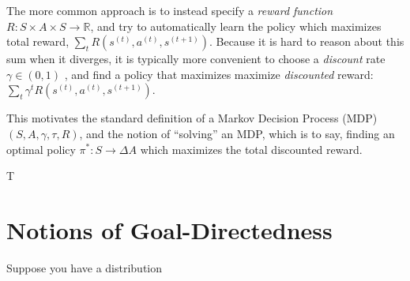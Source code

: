 \documentclass{article}
\DeclareMathOperator*{\argmax}{\arg\max}
\DeclareMathOperator*{\Ex}{\mathbb E}
\begin{document}
    The more common approach is to instead specify a \emph{reward function} $R : S \times A \times S \to \mathbb R$, and try to automatically learn the policy which maximizes total reward, $\sum_{t} R(s^{(t)}, a^{(t)}, s^{(t+1)})$. 
    Because it is hard to reason about this sum when it diverges, it is typically more convenient to choose a \emph{discount} rate $\gamma \in (0,1)$ , and find a policy that maximizes maximize \emph{discounted} reward:
    $
        \sum_{t} \gamma^t R(s^{(t)}, a^{(t)}, s^{(t+1)})
    $.
        
    This motivates the standard definition of a Markov Decision Process (MDP) $(S, A, \gamma, \tau, R)$, and the notion of ``solving'' an MDP, which is to say, finding an optimal policy $\pi^* : S \to \Delta A$ which maximizes the total discounted reward.    
    
    T
        
    
    
    \section{Notions of Goal-Directedness}
    
    Suppose you have a distribution
    
    
    
    
    
\end{document}
